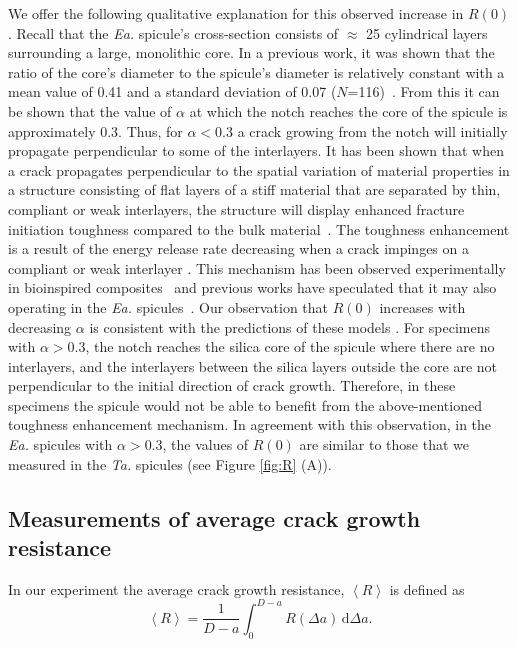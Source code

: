 \documentclass[12pt,onecolumn]{article}
\makeatletter
\newcommand{\TA}{\textit{Ta.\@}\xspace}
\newcommand{\EA}{\textit{Ea.\@}\xspace}
\makeatother
\begin{document}
We offer the following qualitative explanation for this observed increase in $R(0)$. Recall that the \EA spicule's cross-section consists of $\approx$ 25 cylindrical layers surrounding a large, monolithic core. In a previous work, it was shown that the ratio of the core's diameter to the spicule's diameter is relatively constant with a mean value of 0.41 and a standard deviation of 0.07 ($N$=116)~\cite{monn2015new}. From this it can be shown that the value of $\alpha$ at which the notch reaches the core of the spicule is approximately 0.3.
%
Thus, for $\alpha<$0.3 a crack growing from the notch will initially propagate perpendicular to some of the interlayers. It has been shown that when a crack propagates perpendicular to the spatial variation of material properties in a structure consisting of flat layers of a stiff material that are separated by thin, compliant or weak interlayers, the structure will display enhanced fracture initiation toughness compared to the bulk material~\cite{fratzl2007hindered, kolednik2011bioinspired, kolednik2014improvements}. The toughness enhancement is a result of the energy release rate decreasing when a crack impinges on a compliant or weak interlayer \cite{fratzl2007hindered, kolednik2011bioinspired}. This mechanism has been observed experimentally in bioinspired composites~\cite{zechner2013fracture, sistaninia2018design} and previous works have speculated that it may also operating in the \EA spicules~\cite{fratzl2007hindered, kolednik2011bioinspired}. Our observation that $R(0)$ increases with decreasing $\alpha$ is consistent with the predictions of these models \cite{fratzl2007hindered, kolednik2014improvements, kolednik2011bioinspired}.
%
For specimens with $\alpha>$0.3, the notch reaches the silica core of the spicule where there are no interlayers, and the interlayers between the silica layers outside the core are not perpendicular to the initial direction of crack growth. Therefore, in these specimens the spicule would not be able to benefit from the above-mentioned toughness enhancement mechanism. 
%
In agreement with this observation, in the \EA spicules with $\alpha>$0.3, the values of $R(0)$ are similar to those that we measured in the \TA spicules (see Figure \ref{fig:R} (A)).

\subsection*{Measurements of average crack growth resistance}
\label{sec:avgR}
In our experiment the average crack growth resistance, $\left< R \right>$ is defined as
%
\begin{equation}
    \label{eq:avgRdef}
    \left< R \right> =\frac{1}{D-a}\int_0^{D-a}R(\Delta a)\,\mathrm{d}\Delta a.
\end{equation}
%
\end{document}
